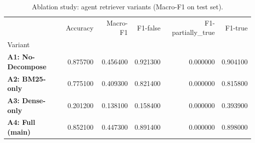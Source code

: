 \begin{table}
\caption{Ablation study: agent retriever variants (Macro-F1 on test set).}
\label{tab:ablation_results}
\begin{tabular}{lrrrrr}
\toprule
 & Accuracy & Macro-F1 & F1-false & F1-partially_true & F1-true \\
Variant &  &  &  &  &  \\
\midrule
\textbf{A1: No-Decompose} & 0.875700 & 0.456400 & 0.921300 & 0.000000 & 0.904100 \\
\textbf{A2: BM25-only} & 0.775100 & 0.409300 & 0.821400 & 0.000000 & 0.815800 \\
\textbf{A3: Dense-only} & 0.201200 & 0.138100 & 0.158400 & 0.000000 & 0.393900 \\
\textbf{A4: Full (main)} & 0.852100 & 0.447300 & 0.891400 & 0.000000 & 0.898000 \\
\bottomrule
\end{tabular}
\end{table}

